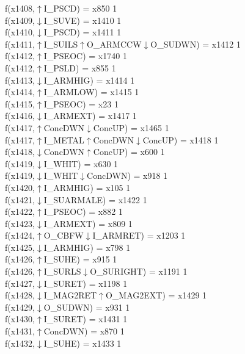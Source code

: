 f(x1408,$\uparrow$I\_PSCD) = x850 {1} \\
f(x1409,$\downarrow$I\_SUVE) = x1410 {1} \\
f(x1410,$\downarrow$I\_PSCD) = x1411 {1} \\
f(x1411,$\uparrow$I\_SUILS$\uparrow$O\_ARMCCW$\downarrow$O\_SUDWN) = x1412 {1} \\
f(x1412,$\uparrow$I\_PSEOC) = x1740 {1} \\
f(x1412,$\uparrow$I\_PSLD) = x855 {1} \\
f(x1413,$\downarrow$I\_ARMHIG) = x1414 {1} \\
f(x1414,$\uparrow$I\_ARMLOW) = x1415 {1} \\
f(x1415,$\uparrow$I\_PSEOC) = x23 {1} \\
f(x1416,$\downarrow$I\_ARMEXT) = x1417 {1} \\
f(x1417,$\uparrow$ConcDWN$\downarrow$ConcUP) = x1465 {1} \\
f(x1417,$\uparrow$I\_METAL$\uparrow$ConcDWN$\downarrow$ConcUP) = x1418 {1} \\
f(x1418,$\downarrow$ConcDWN$\uparrow$ConcUP) = x600 {1} \\
f(x1419,$\downarrow$I\_WHIT) = x630 {1} \\
f(x1419,$\downarrow$I\_WHIT$\downarrow$ConcDWN) = x918 {1} \\
f(x1420,$\uparrow$I\_ARMHIG) = x105 {1} \\
f(x1421,$\downarrow$I\_SUARMALE) = x1422 {1} \\
f(x1422,$\uparrow$I\_PSEOC) = x882 {1} \\
f(x1423,$\downarrow$I\_ARMEXT) = x809 {1} \\
f(x1424,$\uparrow$O\_CBFW$\downarrow$I\_ARMRET) = x1203 {1} \\
f(x1425,$\downarrow$I\_ARMHIG) = x798 {1} \\
f(x1426,$\uparrow$I\_SUHE) = x915 {1} \\
f(x1426,$\uparrow$I\_SURLS$\downarrow$O\_SURIGHT) = x1191 {1} \\
f(x1427,$\downarrow$I\_SURET) = x1198 {1} \\
f(x1428,$\downarrow$I\_MAG2RET$\uparrow$O\_MAG2EXT) = x1429 {1} \\
f(x1429,$\downarrow$O\_SUDWN) = x931 {1} \\
f(x1430,$\uparrow$I\_SURET) = x1431 {1} \\
f(x1431,$\uparrow$ConcDWN) = x870 {1} \\
f(x1432,$\downarrow$I\_SUHE) = x1433 {1} \\
